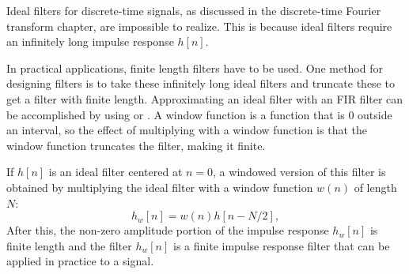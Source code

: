 Ideal filters for discrete-time signals, as discussed in the
discrete-time Fourier transform chapter, are impossible to
realize. This is because ideal filters require an infinitely long
impulse response $h[n]$.

In practical applications, finite length filters have to be used.
One method for designing filters is to take these infinitely
long ideal filters and truncate these to get a filter with finite length.
Approximating an ideal filter with an FIR filter can be accomplished by using \emph{} or \emph{}.
A window function is a function that is 0 outside an interval,
so the effect of multiplying with a window function is that the window
function truncates the filter, making it finite.

If $h[n]$ is an ideal filter centered at $n=0$, a windowed version of
this filter is obtained by multiplying the ideal filter with a window
function $w(n)$ of length $N$:
\begin{equation}
  h_{w}[n] = w(n)h[n-N/2],
  \label{eq:windowed_filter}
\end{equation}
After this, the non-zero amplitude portion of the impulse response
$h_{w}[n]$ is finite length and the filter $h_w[n]$ is a finite impulse
response filter that can be applied in practice to a signal.

